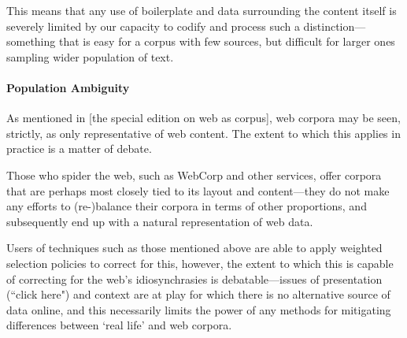 This means that any use of boilerplate and data surrounding the content itself is severely limited by our capacity to codify and process such a distinction---something that is easy for a corpus with few sources, but difficult for larger ones sampling wider population of text.

\paragraph{Population Ambiguity}
As mentioned in [the special edition on web as corpus], web corpora may be seen, strictly, as only representative of web content.  The extent to which this applies in practice is a matter of debate.

Those who spider the web, such as WebCorp and other services, offer corpora that are perhaps most closely tied to its layout and content---they do not make any efforts to (re-)balance their corpora in terms of other proportions, and subsequently end up with a natural representation of web data.

Users of techniques such as those mentioned above are able to apply weighted selection policies to correct for this, however, the extent to which this is capable of correcting for the web's idiosynchrasies is debatable---issues of presentation (``click here") and context are at play for which there is no alternative source of data online, and this necessarily limits the power of any methods for mitigating differences between `real life' and web corpora. %

